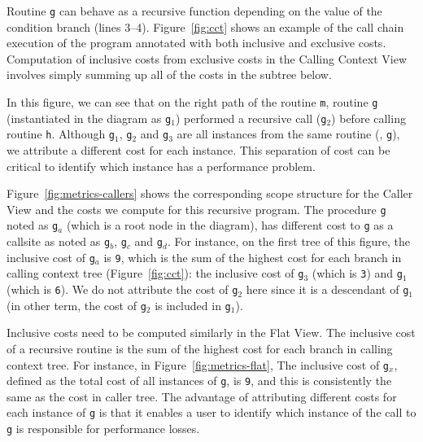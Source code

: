 Routine \texttt{g} can behave as a recursive function depending on the value of the condition branch (lines 3--4).
Figure~\ref{fig:cct} shows an example of the call chain execution of the program annotated with both inclusive and exclusive costs.
Computation of inclusive costs from exclusive costs in the Calling Context View involves simply summing up all of the costs in the subtree below.

In this figure, we can see that on the right path of the routine \texttt{m}, routine \texttt{g} (instantiated in the diagram as \texttt{g$_1$}) performed a recursive call (\texttt{g$_2$}) before calling routine \texttt{h}.
Although \texttt{g$_1$}, \texttt{g$_2$} and \texttt{g$_3$} are all instances from the same routine (\ie{}, \texttt{g}), we attribute a different cost for each instance.
This separation of cost can be critical to identify which instance has a performance problem.

Figure~\ref{fig:metrics-callers} shows the corresponding scope structure for the Caller View and the costs we compute for this recursive program.
The procedure \texttt{g} noted as \texttt{g$_a$} (which is a root node in the diagram), has different cost to \texttt{g} as a callsite as noted as \texttt{g$_b$}, \texttt{g$_c$} and \texttt{g$_d$}.
For instance, on the first tree of this figure, the inclusive cost of \texttt{g$_a$} is \texttt{9}, which is the sum of the highest cost for each branch in calling context tree (Figure~\ref{fig:cct}): the inclusive cost of \texttt{g$_3$} (which is \texttt{3}) and \texttt{g$_1$} (which is \texttt{6}).
We do not attribute the cost of \texttt{g$_2$} here since it is a descendant of \texttt{g$_1$} (in other term, the cost of \texttt{g$_2$} is included in \texttt{g$_1$}).

Inclusive costs need to be computed similarly in the Flat View.
The inclusive cost of a recursive routine is the sum of the highest cost for each branch in calling context tree.
For instance, in Figure~\ref{fig:metrics-flat}, The inclusive cost of \texttt{g$_x$}, defined as the total cost of all instances of \texttt{g}, is \texttt{9}, and this is consistently the same as the cost in caller tree.
The advantage of attributing different costs for each instance of \texttt{g} is that it enables a user to identify which instance of the call to \texttt{g} is responsible for performance losses.



